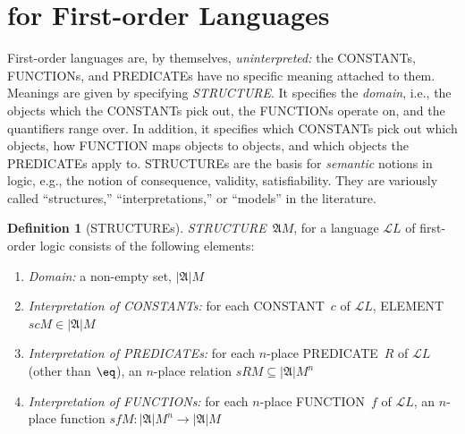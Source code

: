 \documentclass[10pt,a4paper]{article}
\newcommand*{\olup}[1]{\MakeUppercase{#1}}
\theoremstyle{plain}
\theoremstyle{definition}
\newtheorem{defn}[thm]{Definition}
\theoremstyle{remark}
\newenvironment{explain}{}{}
\newcommand*{\olfileid}[3]{}
\newcommand*{\olsection}[1]{\section*{#1}}
\newcommand*{\olchapter}[3]{}
\newcommand*{\olimport}[1]{}
\providecommand{\Struct}{\ensuremath{\mathfrak{A}}}
\providecommand{\Domain}{\ensuremath{|\mathfrak{A}|}}
\providecommand{\Assign}{\ensuremath{s}}
\providecommand{\Lang}{\ensuremath{\mathcal{L}}}
\begin{document}



\olchapter{fol}{sem}{Semantics of First-Order Logic}

\olimport{intro-semantics}

\olimport{structures}

\olimport{covered-structures}

\olimport{satisfaction}

\olimport{assignments}

\olimport{extensionality}

\olimport{semantic-notions}

\OLEndChapterHook





\olfileid{fol}{syn}{str}

\olsection{ for First-order Languages}

\begin{explain}
First-order languages are, by themselves, \emph{uninterpreted:} the
\olup{constant}s, \olup{function}s, and \olup{predicate}s have no specific
meaning attached to them.  Meanings are given by specifying
 \emph{\olup{structure}}. It specifies the
\emph{domain}, i.e., the objects which the \olup{constant}s pick out, the
\olup{function}s operate on, and the quantifiers range over. In addition,
it specifies which \olup{constant}s pick out which objects, how
\olup{function} maps objects to objects, and which objects the
\olup{predicate}s apply to.  \olup{structure}s are the basis for
\emph{semantic} notions in logic, e.g., the notion of consequence,
validity, satisfiability. They are variously called ``structures,''
``interpretations,'' or ``models'' in the literature.
\end{explain}

\begin{defn}[\olup{structure}s]
 \emph{\olup{structure}}~$\Struct M$, for a language
$\Lang{L}$ of first-order logic consists of the following elements:
\begin{enumerate}
\item \emph{Domain:} a non-empty set, $\Domain M$
\item \emph{Interpretation of \olup{constant}s:} for each \olup{constant}~$c$ of
  $\Lang{L}$, \olup{element} $\Assign{c}{M} \in \Domain M$
\item \emph{Interpretation of \olup{predicate}s:} for each $n$-place
  \olup{predicate}~$R$ of $\Lang{L}$ (other than $\eq$), an $n$-place
  relation $\Assign{R}{M} \subseteq \Domain{M}^n$
\item \emph{Interpretation of \olup{function}s:} for each $n$-place
  \olup{function}~$f$ of $\Lang{L}$, an $n$-place function $\Assign{f}{M}
  \colon \Domain{M}^n \to \Domain{M}$
\end{enumerate}
\end{defn}
\end{document}
